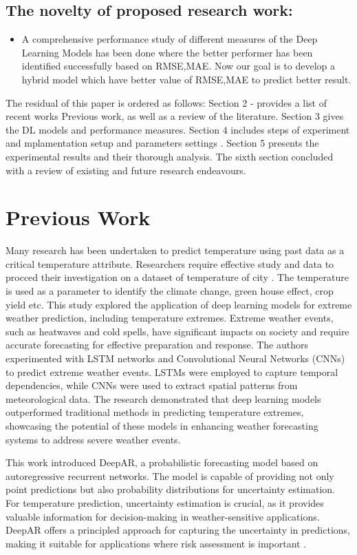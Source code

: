 \documentclass[sn-mathphys,Numbered]{sn-jnl}
\theoremstyle{thmstyleone}
\theoremstyle{thmstyletwo}
\theoremstyle{thmstylethree}
\begin{document}
\subsection{The novelty of proposed research work:}

\begin{itemize}
\item A comprehensive performance study of different measures of the Deep Learning Models has been done where the better performer has been identified successfully based on RMSE,MAE. Now our goal is to develop a hybrid model which have better value of RMSE,MAE to predict better result.
\end{itemize}
The residual of this paper is ordered as follows: Section 2 - provides a list of recent works Previous work, as well as a review of the literature. Section 3 gives the DL models and performance measures. Section 4 includes steps of experiment and mplamentation setup and parameters settings . Section 5 presents the experimental results and their thorough analysis. The sixth section concluded with a review of existing and future research endeavours.

\section{Previous Work}
Many research has been undertaken to predict temperature using past data as a critical temperature attribute. Researchers require effective study and data to procced their investigation on a dataset of temperature of city \cite{cifuentes2020air}. The temperature is used as a parameter to identify the climate change,  green house effect, crop yield etc.
\cite{2019AGUFMGC33A..05P}This study explored the application of deep learning models for extreme weather prediction, including temperature extremes. Extreme weather events, such as heatwaves and cold spells, have significant impacts on society and require accurate forecasting for effective preparation and response. The authors experimented with LSTM networks and Convolutional Neural Networks (CNNs) to predict extreme weather events. LSTMs were employed to capture temporal dependencies, while CNNs were used to extract spatial patterns from meteorological data. The research demonstrated that deep learning models outperformed traditional methods in predicting temperature extremes, showcasing the potential of these models in enhancing weather forecasting systems to address severe weather events.

This work introduced DeepAR, a probabilistic forecasting model based on autoregressive recurrent networks. The model is capable of providing not only point predictions but also probability distributions for uncertainty estimation. For temperature prediction, uncertainty estimation is crucial, as it provides valuable information for decision-making in weather-sensitive applications. DeepAR offers a principled approach for capturing the uncertainty in predictions, making it suitable for applications where risk assessment is important \cite{salinas2020deepar}.
\end{document}
